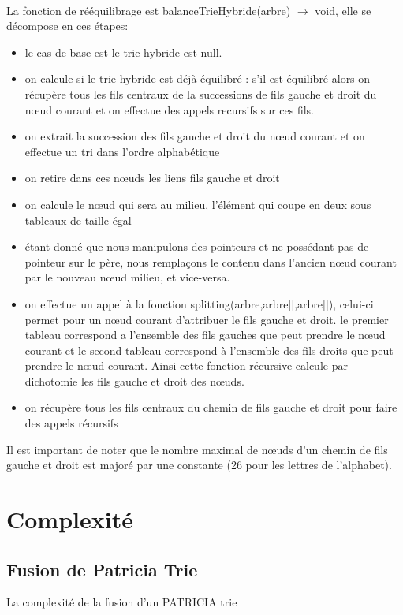\documentclass[a4paper,12pt]{report}
\begin{document}
\paragraph{}
La fonction de rééquilibrage est balanceTrieHybride(arbre) $\rightarrow$ void, elle se décompose en ces étapes:
\begin{itemize}
 \item le cas de base est le trie hybride est null.
 \item on calcule si le trie hybride est déjà équilibré : s'il est équilibré alors on récupère tous les fils centraux de la
 successions de fils gauche et droit du nœud courant et on effectue des appels recursifs sur ces fils.
 \item on extrait la succession des fils gauche et droit du nœud courant et on effectue un tri dans l'ordre alphabétique
 \item on retire dans ces nœuds les liens fils gauche et droit
 \item on calcule le nœud qui sera au milieu, l'élément qui coupe en deux sous tableaux de taille égal
 \item étant donné que nous manipulons des pointeurs et ne possédant pas de pointeur sur le père, nous remplaçons le contenu
 dans l'ancien nœud courant par le nouveau nœud milieu, et vice-versa.
 \item on effectue un appel à la fonction splitting(arbre,arbre[],arbre[]), celui-ci permet pour un nœud courant d'attribuer le
 fils gauche et droit. le premier tableau correspond a l'ensemble des fils gauches que peut prendre le nœud courant et le second
 tableau correspond à l'ensemble des fils droits que peut prendre le nœud courant. Ainsi cette fonction récursive calcule par
 dichotomie les fils gauche et droit des nœuds.
 \item on récupère tous les fils centraux du chemin de fils gauche et droit pour faire des appels récursifs
\end{itemize}
Il est important de noter que le nombre maximal de nœuds d'un chemin de fils gauche et droit est majoré par une constante (26
pour les lettres de l'alphabet).

\section{Complexité}
\subsection{Fusion de Patricia Trie}
La complexité de la fusion d'un PATRICIA trie
\end{document}
